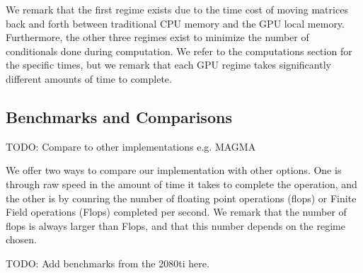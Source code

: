 We remark that the first regime exists due to the time cost of moving matrices back and forth between traditional CPU memory and the GPU local memory. Furthermore, the other three regimes exist to minimize the number of conditionals done during computation. We refer to the computations section for the specific times, but we remark that each GPU regime takes significantly different amounts of time to complete.

\subsection{Benchmarks and Comparisons}

TODO: Compare to other implementations e.g. MAGMA

We offer two ways to compare our implementation with other options. One is through raw speed in the amount of time it takes to complete the operation, and the other is by counring the number of floating point operations (flops) or Finite Field operations (Flops) completed per second. We remark that the number of flops is always larger than Flops, and that this number depends on the regime chosen.

TODO: Add benchmarks from the 2080ti here.